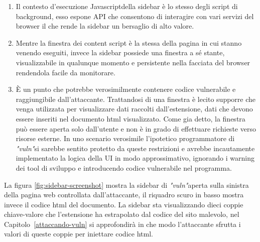 \documentclass{sapthesis}
\newcommand{\Capitolo}[1]{Capitolo~\ref{#1}}
\newcommand{\vuln}{\textit{"vuln"}}
\newcommand{\JS}{Javascript}
\begin{document}
        \begin{enumerate}
            \item Il contesto d'esecuzione \JS della sidebar è lo stesso degli script di background, esso espone
                    API che consentono di interagire con vari servizi del browser il che rende la sidebar un
                    bersaglio di alto valore.

            \item Mentre la finestra dei content script è la stessa della pagina in cui stanno venendo eseguiti,
                    invece la sidebar possiede una finestra a sé stante, visualizzabile in qualunque momento e 
                    persistente nella facciata del browser rendendola facile da monitorare.

            \item È un punto che potrebbe verosimilmente contenere codice vulnerabile e raggiungibile dall'attaccante.
                    Trattandosi di una finestra è lecito supporre che venga utilizzata per visualizzare dati raccolti 
                    dall'estensione, dati che devono essere inseriti nel documento html visualizzato.
                    Come gia detto, la finestra può essere aperta solo dall'utente e non
                    è in grado di effettuare richieste verso risorse esterne. In uno scenario verosimile l'ipotetico programmatore
                    di \vuln si sarebbe sentito protetto da queste restrizioni e avrebbe incautamente implementato
                    la logica della UI in modo approssimativo, ignorando i warning dei tool di
                    sviluppo e introducendo codice vulnerabile nel programma.
        \end{enumerate}

        La figura \ref{fig:sidebar-screenshot} mostra la sidebar di \vuln aperta sulla sinistra della pagina
        web controllata dall'attaccante, il riquadro scuro in basso mostra invece il codice html del documento.
        La sidebar sta visualizzando dieci coppie chiave-valore che l'estensione ha estrapolato dal codice
        del sito malevolo, nel \Capitolo{attaccando-vuln} si approfondirà in che modo l'attaccante sfrutta i
        valori di queste coppie per iniettare codice html.
\end{document}
